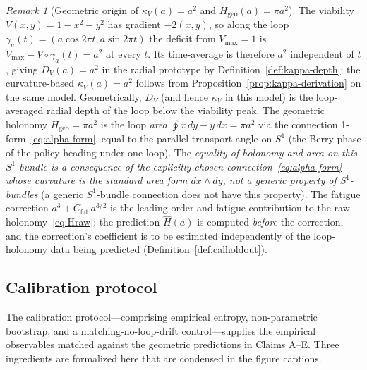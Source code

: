 \documentclass[11pt,a4paper]{article}
\theoremstyle{plain}
\theoremstyle{definition}
\theoremstyle{remark}
\newtheorem{remark}[theorem]{Remark}
\newcommand{\kk}{\kappa_{\!V}}
\begin{document}
\begin{remark}[Geometric origin of $\kk(a)=a^2$ and $H_{\mathrm{geo}}(a)=\pi a^2$]
\label{rem:kappa-intuition}
The viability $V(x,y)=1-x^2-y^2$ has gradient $-2(x,y)$, so along the
loop $\gamma_a(t)=(a\cos 2\pi t, a\sin 2\pi t)$ the deficit from
$V_{\max}=1$ is $V_{\max}-V\circ\gamma_a(t)=a^2$ at every $t$. Its
time-average is therefore $a^2$ independent of $t$, giving
$D_V(a)=a^2$ in the radial prototype by
Definition~\ref{def:kappa-depth}; the curvature-based $\kk(a) = a^2$
follows from Proposition~\ref{prop:kappa-derivation} on the same
model. Geometrically, $D_V$ (and hence $\kk$ in this model) is
the loop-averaged radial depth of the loop below the viability peak.
The geometric holonomy $H_{\mathrm{geo}}=\pi a^2$ is the loop
\emph{area} $\oint x\,dy - y\,dx = \pi a^2$ via the connection
1-form~\eqref{eq:alpha-form}, equal to the parallel-transport angle
on $S^1$ (the Berry phase of the policy heading under one loop). The
\emph{equality of holonomy and area on this $S^1$-bundle is a
consequence of the explicitly chosen connection~\eqref{eq:alpha-form}
whose curvature is the standard area form $dx\wedge dy$, not a
generic property of $S^1$-bundles} (a generic $S^1$-bundle connection
does not have this property). The fatigue correction
$a^3 + C_{\mathrm{fat}}\,a^{3/2}$ is the leading-order and fatigue
contribution to the raw holonomy~\eqref{eq:Hraw}; the prediction
$\widehat H(a)$ is computed \emph{before} the correction, and the
correction's coefficient is to be estimated independently of the
loop-holonomy data being predicted (Definition~\ref{def:calholdout}).
\end{remark}

\subsection{Calibration protocol}
\label{sec:calibration}
The calibration protocol---comprising empirical entropy, non-parametric
bootstrap, and a matching-no-loop-drift control---supplies the empirical
observables matched against the geometric predictions in Claims A--E.
Three ingredients are formalized here that are condensed in the figure
captions.
\end{document}
